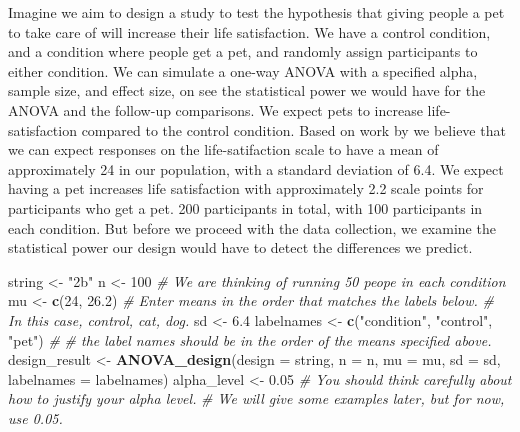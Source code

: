 \documentclass[]{book}
\newenvironment{Shaded}{\begin{snugshade}}{\end{snugshade}}
\newcommand{\CommentTok}[1]{\textcolor[rgb]{0.56,0.35,0.01}{\textit{#1}}}
\newcommand{\DataTypeTok}[1]{\textcolor[rgb]{0.13,0.29,0.53}{#1}}
\newcommand{\DecValTok}[1]{\textcolor[rgb]{0.00,0.00,0.81}{#1}}
\newcommand{\FloatTok}[1]{\textcolor[rgb]{0.00,0.00,0.81}{#1}}
\newcommand{\KeywordTok}[1]{\textcolor[rgb]{0.13,0.29,0.53}{\textbf{#1}}}
\newcommand{\NormalTok}[1]{#1}
\newcommand{\StringTok}[1]{\textcolor[rgb]{0.31,0.60,0.02}{#1}}
\begin{document}
Imagine we aim to design a study to test the hypothesis that giving people a pet to take care of will increase their life satisfaction. We have a control condition, and a condition where people get a pet, and randomly assign participants to either condition. We can simulate a one-way ANOVA with a specified alpha, sample size, and effect size, on see the statistical power we would have for the ANOVA and the follow-up comparisons. We expect pets to increase life-satisfaction compared to the control condition. Based on work by \citet{pavot1993affective} we believe that we can expect responses on the life-satifaction scale to have a mean of approximately 24 in our population, with a standard deviation of 6.4. We expect having a pet increases life satisfaction with approximately 2.2 scale points for participants who get a pet. 200 participants in total, with 100 participants in each condition. But before we proceed with the data collection, we examine the statistical power our design would have to detect the differences we predict.

\begin{Shaded}
\begin{Highlighting}[]
\NormalTok{string <-}\StringTok{ "2b"}
\NormalTok{n <-}\StringTok{ }\DecValTok{100}
\CommentTok{# We are thinking of running 50 peope in each condition}
\NormalTok{mu <-}\StringTok{ }\KeywordTok{c}\NormalTok{(}\DecValTok{24}\NormalTok{, }\FloatTok{26.2}\NormalTok{)}
\CommentTok{# Enter means in the order that matches the labels below.}
\CommentTok{# In this case, control, cat, dog. }
\NormalTok{sd <-}\StringTok{ }\FloatTok{6.4}
\NormalTok{labelnames <-}\StringTok{ }\KeywordTok{c}\NormalTok{(}\StringTok{"condition"}\NormalTok{, }\StringTok{"control"}\NormalTok{, }\StringTok{"pet"}\NormalTok{) }\CommentTok{#}
\CommentTok{# the label names should be in the order of the means specified above.}
\NormalTok{design_result <-}\StringTok{ }\KeywordTok{ANOVA_design}\NormalTok{(}\DataTypeTok{design =}\NormalTok{ string,}
                   \DataTypeTok{n =}\NormalTok{ n, }
                   \DataTypeTok{mu =}\NormalTok{ mu, }
                   \DataTypeTok{sd =}\NormalTok{ sd, }
                   \DataTypeTok{labelnames =}\NormalTok{ labelnames)}
\NormalTok{alpha_level <-}\StringTok{ }\FloatTok{0.05}
\CommentTok{# You should think carefully about how to justify your alpha level.}
\CommentTok{# We will give some examples later, but for now, use 0.05.}
\end{Highlighting}
\end{Shaded}
\end{document}
